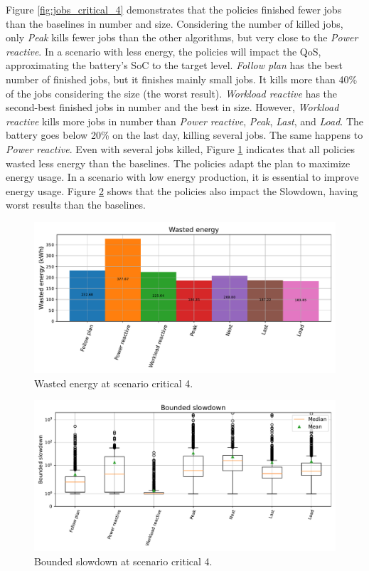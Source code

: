 Figure \ref{fig:jobs_critical_4} demonstrates that the policies finished fewer jobs than the baselines in number and size. Considering the number of killed jobs, only \emph{Peak} kills fewer jobs than the other algorithms, but very close to the \emph{Power reactive}. In a scenario with less energy, the policies will impact the QoS, approximating the battery's SoC to the target level. \emph{Follow plan} has the best number of finished jobs, but it finishes mainly small jobs. It kills more than 40\% of the jobs considering the size (the worst result). \emph{Workload reactive} has the second-best finished jobs in number and the best in size. However, \emph{Workload reactive} kills more jobs in number than \emph{Power reactive}, \emph{Peak}, \emph{Last}, and \emph{Load}. The battery goes below 20\% on the last day, killing several jobs. The same happens to \emph{Power reactive}. Even with several jobs killed, Figure \ref{fig:energy_critical_4} indicates that all policies wasted less energy than the baselines. The policies adapt the plan to maximize energy usage. In a scenario with low energy production, it is essential to improve energy usage. Figure \ref{fig:slowdown_critical_4} shows that the policies also impact the Slowdown, having worst results than the baselines. 

\begin{figure}[!htb]
    \centering
    \includegraphics[scale=0.55]{Images/Compensations/energy_critical_4.pdf}
    \caption{Wasted energy at scenario critical 4.}
    \label{fig:energy_critical_4}
\end{figure}

\begin{figure}[!htb]
    \centering
    \includegraphics[scale=0.55]{Images/Compensations/slowdown_critical_4.pdf}
    \caption{Bounded slowdown at scenario critical 4.}
    \label{fig:slowdown_critical_4}
\end{figure}

